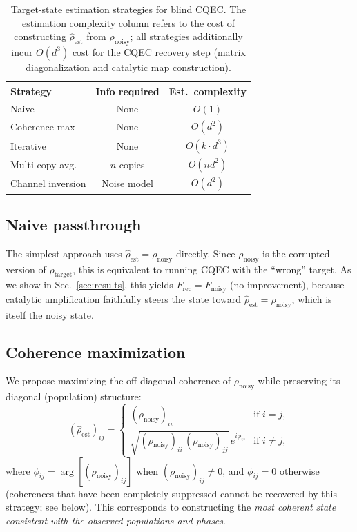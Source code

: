 \documentclass[a4paper,onecolumn]{quantumarticle}
\newcommand{\Frec}{F_\mathrm{rec}}
\newcommand{\Fnoisy}{F_\mathrm{noisy}}
\newcommand{\rhot}{\rho_\mathrm{target}}
\newcommand{\rhon}{\rho_\mathrm{noisy}}
\newcommand{\rhoe}{\hat{\rho}_\mathrm{est}}
\begin{document}
\begin{table}[b]
\caption{Target-state estimation strategies for blind CQEC.
The estimation complexity column refers to the cost of constructing $\rhoe$ from $\rhon$; all strategies additionally incur $O(d^3)$ cost for the CQEC recovery step (matrix diagonalization and catalytic map construction).}
\label{tab:strategies}

\begin{tabular}{lcc}
Strategy & Info required & Est.\ complexity \\
\hline
Naive & None & $O(1)$ \\
Coherence max & None & $O(d^2)$ \\
Iterative & None & $O(k \cdot d^3)$ \\
Multi-copy avg. & $n$ copies & $O(n d^2)$ \\
Channel inversion & Noise model & $O(d^2)$ \\
\end{tabular}

\end{table}


\subsection{Naive passthrough}
\label{sec:naive}

The simplest approach uses $\rhoe = \rhon$ directly.
Since $\rhon$ is the corrupted version of $\rhot$, this is equivalent to running CQEC with the ``wrong'' target.
As we show in Sec.~\ref{sec:results}, this yields $\Frec = \Fnoisy$ (no improvement), because catalytic amplification faithfully steers the state toward $\rhoe = \rhon$, which is itself the noisy state.

\subsection{Coherence maximization}
\label{sec:cohmax}

We propose maximizing the off-diagonal coherence of $\rhon$ while preserving its diagonal (population) structure:
\begin{equation}
(\rhoe)_{ij} = \begin{cases}
(\rhon)_{ii} & \text{if } i = j, \\
\sqrt{(\rhon)_{ii}\,(\rhon)_{jj}}\,e^{i\phi_{ij}} & \text{if } i \neq j,
\end{cases}
\label{eq:cohmax}
\end{equation}
where $\phi_{ij} = \arg[(\rhon)_{ij}]$ when $(\rhon)_{ij} \neq 0$, and $\phi_{ij} = 0$ otherwise (coherences that have been completely suppressed cannot be recovered by this strategy; see below).
This corresponds to constructing the \emph{most coherent state consistent with the observed populations and phases}.
\end{document}
